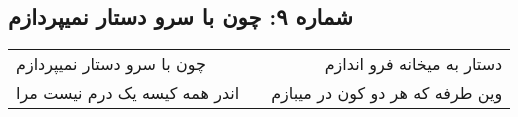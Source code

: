 \begin{center}
\section*{شماره ۹: چون با سرو دستار نمیپردازم}
\label{sec:009}
\begin{longtable}{l p{0.5cm} r}
چون با سرو دستار نمیپردازم
&&
دستار به میخانه فرو اندازم
\\
اندر همه کیسه یک درم نیست مرا
&&
وین طرفه که هر دو کون در میبازم
\\
\end{longtable}
\end{center}

